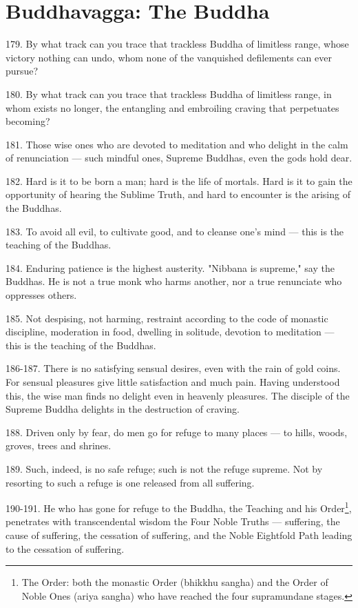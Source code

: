 \newpage
\chapter{Buddhavagga: The Buddha}
179. By what track can you trace that trackless Buddha of limitless range, whose victory nothing can undo, whom none of the vanquished defilements can ever pursue?

180. By what track can you trace that trackless Buddha of limitless range, in whom exists no longer, the entangling and embroiling craving that perpetuates becoming?

181. Those wise ones who are devoted to meditation and who delight in the calm of renunciation — such mindful ones, Supreme Buddhas, even the gods hold dear.

182. Hard is it to be born a man; hard is the life of mortals. Hard is it to gain the opportunity of hearing the Sublime Truth, and hard to encounter is the arising of the Buddhas.

183. To avoid all evil, to cultivate good, and to cleanse one's mind — this is the teaching of the Buddhas.

184. Enduring patience is the highest austerity. "Nibbana is supreme," say the Buddhas. He is not a true monk who harms another, nor a true renunciate who oppresses others.

185. Not despising, not harming, restraint according to the code of monastic discipline, moderation in food, dwelling in solitude, devotion to meditation — this is the teaching of the Buddhas.

186-187. There is no satisfying sensual desires, even with the rain of gold coins. For sensual pleasures give little satisfaction and much pain. Having understood this, the wise man finds no delight even in heavenly pleasures. The disciple of the Supreme Buddha delights in the destruction of craving.

188. Driven only by fear, do men go for refuge to many places — to hills, woods, groves, trees and shrines.

189. Such, indeed, is no safe refuge; such is not the refuge supreme. Not by resorting to such a refuge is one released from all suffering.

190-191. He who has gone for refuge to the Buddha, the Teaching and his Order\footnote{The Order: both the monastic Order (bhikkhu sangha) and the Order of Noble Ones (ariya sangha) who have reached the four supramundane stages.}, penetrates with transcendental wisdom the Four Noble Truths — suffering, the cause of suffering, the cessation of suffering, and the Noble Eightfold Path leading to the cessation of suffering.

